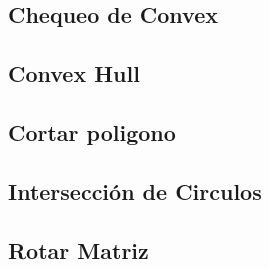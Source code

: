 \subsection{Chequeo de Convex}


\newpage
\subsection{Convex Hull}


\subsection{Cortar poligono}


\subsection{Intersecci\'on de Circulos}


\subsection{Rotar Matriz}

